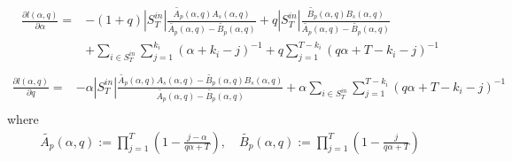 \documentclass[a4paper, 12pt]{article}
\newcommand{\sint}{|S^{in}_T|}
\begin{document}
\begin{align*}
    \frac{\partial l(\alpha, q)}{\partial \alpha} = &-(1 + q)\sint \frac{ \widetilde{A_p}(\alpha, q) A_s(\alpha, q) }{\widetilde{A_p}(\alpha, q) - \widetilde{B_p}(\alpha, q)} + q|S_T^{in}| \frac{\widetilde{B_p}(\alpha, q) B_s(\alpha, q)  }{ \widetilde{A_p}(\alpha, q) - \widetilde{B_p}(\alpha, q)} \\
    &+ \sum_{i \in S_T^{in}} \sum_{j = 1}^{k_i} (\alpha + k_i - j)^{-1} + q\sum_{j = 1}^{T - k_i} (q\alpha + T - k_i - j)^{-1} \\
\end{align*}
\begin{align*}
    \frac{\partial l(\alpha, q)}{\partial q} =& -\alpha \sint \frac{ \widetilde{A_p}(\alpha, q) A_s(\alpha, q) - \widetilde{B_p}(\alpha, q) B_s(\alpha, q)  }{ \widetilde{A_p}(\alpha, q) - \widetilde{B_p}(\alpha, q)} + \alpha \sum_{i \in S_T^{in}} \sum_{j = 1}^{T - k_i} (q\alpha + T - k_i - j)^{-1} \\
\end{align*}
where
\begin{align*}
\widetilde{A_p}(\alpha, q) := \prod_{j = 1}^{T} \left(1 - \frac{j - \alpha}{q\alpha + T}\right)  ,\quad \widetilde{B_p}(\alpha, q) := \prod_{j = 1}^{T} \left(1 - \frac{j}{q\alpha + T}\right) \\
\end{align*}
\end{document}
